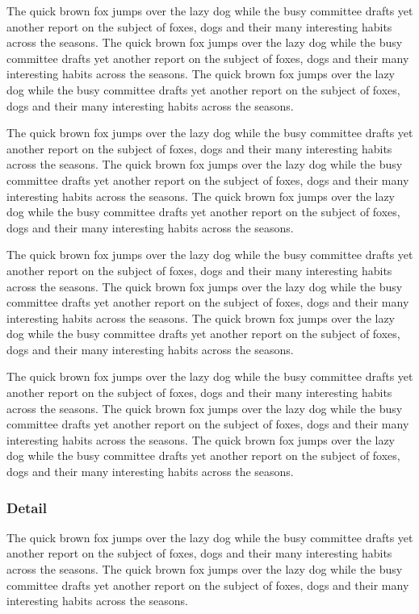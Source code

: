 \documentclass{article}
\begin{document}
The quick brown fox jumps over the lazy dog while the busy committee drafts yet another report on the subject of foxes, dogs and their many interesting habits across the seasons. The quick brown fox jumps over the lazy dog while the busy committee drafts yet another report on the subject of foxes, dogs and their many interesting habits across the seasons. The quick brown fox jumps over the lazy dog while the busy committee drafts yet another report on the subject of foxes, dogs and their many interesting habits across the seasons. 

The quick brown fox jumps over the lazy dog while the busy committee drafts yet another report on the subject of foxes, dogs and their many interesting habits across the seasons. The quick brown fox jumps over the lazy dog while the busy committee drafts yet another report on the subject of foxes, dogs and their many interesting habits across the seasons. The quick brown fox jumps over the lazy dog while the busy committee drafts yet another report on the subject of foxes, dogs and their many interesting habits across the seasons. 

The quick brown fox jumps over the lazy dog while the busy committee drafts yet another report on the subject of foxes, dogs and their many interesting habits across the seasons. The quick brown fox jumps over the lazy dog while the busy committee drafts yet another report on the subject of foxes, dogs and their many interesting habits across the seasons. The quick brown fox jumps over the lazy dog while the busy committee drafts yet another report on the subject of foxes, dogs and their many interesting habits across the seasons. 

The quick brown fox jumps over the lazy dog while the busy committee drafts yet another report on the subject of foxes, dogs and their many interesting habits across the seasons. The quick brown fox jumps over the lazy dog while the busy committee drafts yet another report on the subject of foxes, dogs and their many interesting habits across the seasons. The quick brown fox jumps over the lazy dog while the busy committee drafts yet another report on the subject of foxes, dogs and their many interesting habits across the seasons. 

\subsubsection{Detail}
The quick brown fox jumps over the lazy dog while the busy committee drafts yet another report on the subject of foxes, dogs and their many interesting habits across the seasons. The quick brown fox jumps over the lazy dog while the busy committee drafts yet another report on the subject of foxes, dogs and their many interesting habits across the seasons. 
\end{document}
